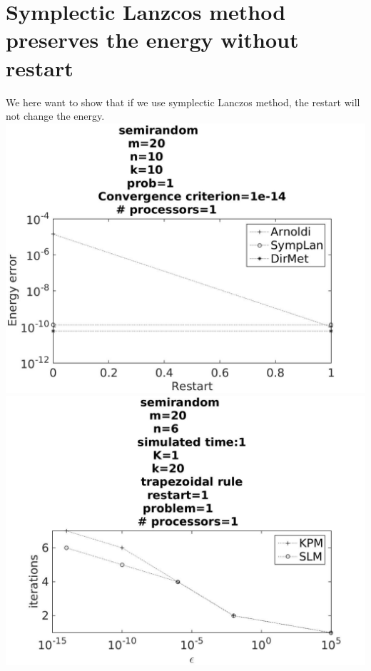 \chapter{Symplectic Lanzcos method preserves the energy without restart}
We here want to show that if we use symplectic Lanczos method, the restart will not change the energy. \\
\includegraphics[scale = 0.17]{../MATLAB/fig/compareEnergy.jpg}
\includegraphics[scale = 0.17]{../MATLAB/fig/compareIter.jpg}


